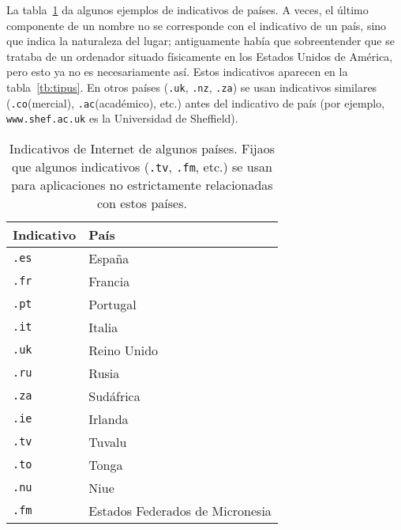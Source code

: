 La tabla~\ref{tb:pais} da algunos ejemplos de indicativos de países. A veces, el último componente de un nombre no se corresponde con el indicativo de un país, sino que indica la naturaleza del lugar; antiguamente había que sobreentender que se trataba de un ordenador situado físicamente en los Estados Unidos de América, pero esto ya no es necesariamente así. Estos indicativos aparecen en la tabla~\ref{tb:tipus}. En otros países ({\tt .uk}, {\tt .nz}, {\tt .za}) se usan indicativos similares ({\tt .co}(mercial), {\tt .ac}(académico), etc.) antes del indicativo de país (por ejemplo, {\tt www.shef.ac.uk} es la Universidad de Sheffield). 

\begin{table} \begin{center} \begin{tabular}{l|l} \hline\hline {\sc Indicativo} &{\sc País} \\\hline {\tt .es} &España \\ {\tt .fr} &Francia \\ {\tt .pt} &Portugal \\ {\tt .it} &Italia \\ {\tt .uk} &Reino Unido \\ {\tt .ru} &Rusia \\ {\tt .za} &Sudáfrica \\ {\tt .ie} &Irlanda \\ {\tt .tv} &Tuvalu \\ {\tt .to} &Tonga \\ {\tt .nu} &Niue \\ {\tt .fm} &Estados Federados de Micronesia \\ \hline

\end{tabular} \end{center} \caption{Indicativos de Internet de algunos países. Fijaos que algunos indicativos (\texttt{.tv}, \texttt{.fm}, etc.) se usan para aplicaciones no estrictamente relacionadas con estos países.} \label{tb:pais} \end{table} 

